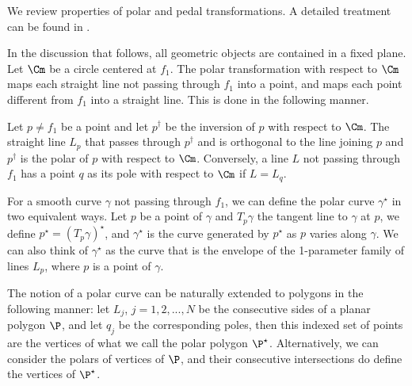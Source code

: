 

We review properties of polar and pedal transformations. A detailed treatment can be found in \cite{akopyan2007-conics,stachel2019-conics}.

In the discussion that follows, all geometric objects are contained in a fixed plane. Let $\Cm$ be a circle centered at $f_1$. The polar transformation with respect to $\Cm$ maps each straight line not passing through $f_1$ into a point, and maps each point different from $f_1$ into a straight line. This is done in the following manner.

 Let $p\neq f_{1}$ be a point and let ${p}^\dagger$ be the inversion of $p$ with respect to $\Cm$. The straight line $L_{p}$ that passes through ${p}^\dagger$ and is orthogonal to the line joining $p$ and ${p}^\dagger$ is the polar of $p$ with respect to $\Cm$. Conversely, a line $L$ not passing through $f_1$ has a point $q$ as its pole with respect to $\Cm$ if $L=L_{q}$.

For a smooth curve $\gamma$ not passing through $f_1$, we can define the polar curve $\gamma^{\star}$ in two equivalent ways. Let $p$ be a point of $\gamma$ and $T_{p}\gamma$ the tangent line to $\gamma$ at $p$, we define $p^{\star}=(T_{p}\gamma)^{\star}$, and $\gamma^{\star}$ is the curve generated by $p^{\star}$ as $p$ varies along $\gamma$. We can also think of $\gamma^{\star}$ as the curve that is the envelope of the 1-parameter family of lines $L_{p}$, where $p$ is a point of $\gamma$.

The notion of a polar curve can be naturally extended to polygons in the following manner: let $L_{j}$, $j=1,2,...,N$ be the consecutive sides of a planar polygon $\P$, and let $q_{j}$ be the corresponding poles, then this indexed set of points are the vertices of what we call the polar polygon $\P^{\star}$. Alternatively, we can consider the polars of vertices of $\P$, and their consecutive intersections do define the vertices of $\P^{\star}$.

 

